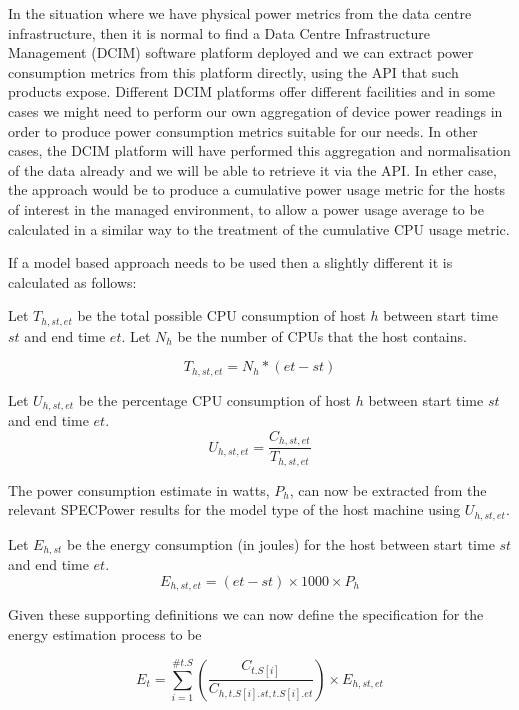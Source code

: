 In the situation where we have physical power metrics from the data centre infrastructure, then it is normal to find a Data Centre Infrastructure Management (DCIM) software platform deployed and we can extract power consumption metrics from this platform directly, using the API that such products expose. Different DCIM platforms offer different facilities and in some cases we might need to perform our own aggregation of device power readings in order to produce power consumption metrics suitable for our needs.  In other cases, the DCIM platform will have performed this aggregation and normalisation of the data already and we will be able to retrieve it via the API.  In ether case, the approach would be to produce a cumulative power usage metric for the hosts of interest in the managed environment, to allow a power usage average to be calculated in a similar way to the treatment of the cumulative CPU usage metric.

If a model based approach needs to be used then a slightly different it is calculated as follows:

Let $T_{h,st,et}$ be the total possible CPU consumption of host $h$ between start time $st$ and end time $et$.  Let $N_{h}$ be the number of CPUs that the host contains.

\begin{equation}
T_{h,st,et} = N_{h} * (et - st)
\end{equation}

Let $U_{h,st,et}$ be the percentage CPU consumption of host $h$ between start time $st$ and end time $et$.
\begin{equation}
U_{h,st,et} = \frac{C_{h,st,et}}{T_{h,st,et}}
\end{equation}

The power consumption estimate in watts, $P_{h}$, can now be extracted from the relevant SPECPower results for the model type of the host machine using $U_{h,st,et}$.

Let $E_{h,st}$ be the energy consumption (in joules) for the host between start time $st$ and end time $et$.
\begin{equation}
E_{h,st,et} = (et - st) \times 1000 \times P_{h}
\end{equation}


Given these supporting definitions we can now define the specification for the energy estimation process to be

\begin{equation}
E_{t} = \sum_{i=1}^{\#t.S} \left( \frac {C_{t.S[i]}} {C_{h,t.S[i].st,t.S[i].et}} \right) \times E_{h, st, et}
\end{equation}

